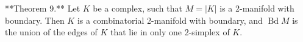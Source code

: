 **Theorem 9.** Let $K$ be a complex, such that $M = |K|$ is a 2-manifold with boundary. Then $K$ is a combinatorial 2-manifold with boundary, and $\operatorname{Bd} M$ is the union of the edges of $K$ that lie in only one 2-simplex of $K$.
